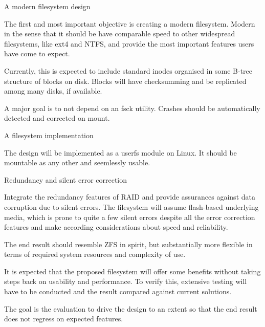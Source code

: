     \begin{description}
        \item{A modern filesystem design}

            The first and most important objective is creating a modern
            filesystem.  Modern in the sense that it should be have comparable
            speed to other widespread filesystems, like ext4 and NTFS, and
            provide the most important features users have come to expect.

            Currently, this is expected to include standard inodes organised in
            some B-tree structure of blocks on disk. Blocks will have
            checksumming and be replicated among many disks, if available.

            A major goal is to not depend on an fsck utility. Crashes should be
            automatically detected and corrected on mount.

        \item{A filesystem implementation}

            The design will be implemented as a userfs module on Linux. It
            should be mountable as any other and seemlessly usable.

        \item{Redundancy and silent error correction}

            Integrate the redundancy features of RAID and provide assurances
            against data corruption due to silent errors. The filesystem will
            assume flash-based underlying media, which is prone to quite a few
            silent errors despite all the error correction features
            \cite{facebook_flash, google_flash} and make according
            considerations about speed and reliability.

            The end result should resemble ZFS in spirit, but substantially
            more flexible in terms of required system resources and complexity
            of use.

        \item[Comparison and evaluation]

            It is expected that the proposed filesystem will offer some
            benefits without taking steps back on usability and performance. To
            verify this, extensive testing will have to be conducted and the
            result compared against current solutions.

            The goal is the evaluation to drive the design to an extent so that
            the end result does not regress on expected features.

    \end{description}


